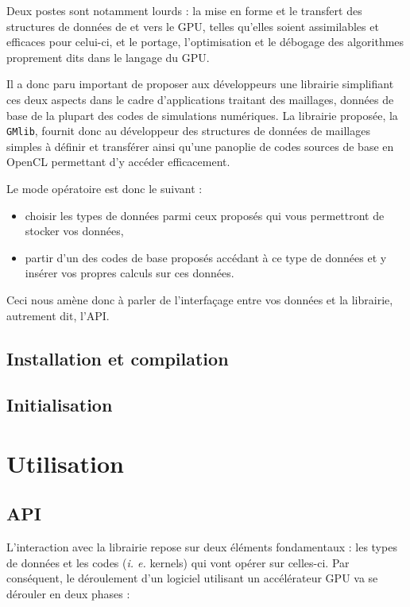\documentclass[a4paper,12pt]{article}
\begin{document}
Deux postes sont notamment lourds : la mise en forme et le transfert des structures de données de et vers le GPU, telles qu'elles soient assimilables et efficaces pour celui-ci, et le portage, l'optimisation et le débogage des algorithmes proprement dits dans le langage du GPU.

Il a donc paru important de proposer aux développeurs une librairie simplifiant ces deux aspects dans le cadre d'applications traitant des maillages, données de base de la plupart des codes de simulations numériques. La librairie proposée, la {\tt GMlib}, fournit donc au développeur des structures de données de maillages simples à définir et transférer ainsi qu'une panoplie de codes sources de base en OpenCL permettant d'y accéder efficacement.

Le mode opératoire est donc le suivant :

\begin{itemize}
\item choisir les types de données parmi ceux proposés qui vous permettront de stocker vos données,
\item partir d'un des codes de base proposés accédant à ce type de données et y insérer vos propres calculs sur ces données.
\end{itemize}

Ceci nous amène donc à parler de l'interfaçage entre vos données et la librairie, autrement dit, l'API.

\subsection{Installation et compilation}

\subsection{Initialisation}


%
%

\section{Utilisation}

\subsection{API}
\label{sec:API}
L'interaction avec la librairie repose sur deux éléments fondamentaux : les types de données et les codes (\emph{i. e.} kernels) qui vont opérer sur celles-ci. Par conséquent, le déroulement d'un logiciel utilisant un accélérateur GPU va se dérouler en deux phases :
\end{document}
